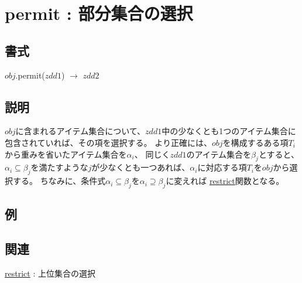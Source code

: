 
\section{permit : 部分集合の選択\label{sect:permit}}
\subsection*{書式}
$obj$.permit($zdd1$) $\rightarrow$ $zdd2$

\subsection*{説明}
$obj$に含まれるアイテム集合について、$zdd1$中の少なくとも1つのアイテム集合に包含されていれば、その項を選択する。
より正確には、$obj$を構成するある項$T_i$から重みを省いたアイテム集合を$\alpha_i$、
同じく$zdd1$のアイテム集合を$\beta_j$とすると、
$\alpha_i \subseteq \beta_j$を満たすような$j$が少なくとも一つあれば、$\alpha_i$に対応する項$T_i$を$obj$から選択する。
ちなみに、条件式$\alpha_i \subseteq \beta_j$を$\alpha_i \supseteq \beta_j$に変えれば
\hyperref[sect:restrict]{restrict}関数となる。


\subsection*{例}


\subsection*{関連}
\hyperref[sect:restrict]{restrict} : 上位集合の選択
